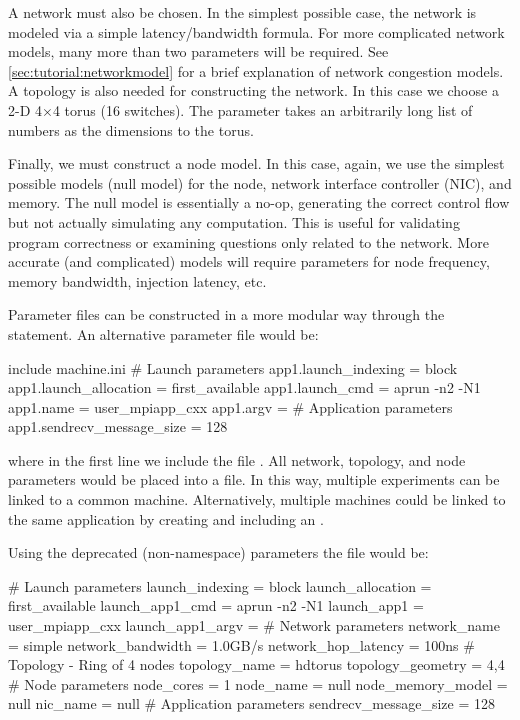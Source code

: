 A network must also be chosen.  
In the simplest possible case, the network is modeled via a simple latency/bandwidth formula.  
For more complicated network models, many more than two parameters will be required. 
See \ref{sec:tutorial:networkmodel} for a brief explanation of \sstmacro network congestion models. 
A topology is also needed for constructing the network.  
In this case we choose a 2-D 4$\times$4 torus (16 switches).  The  
parameter takes an arbitrarily long list of numbers as the dimensions to the torus.

Finally, we must construct a node model.  
In this case, again, we use the simplest possible models (null model) for the node, 
network interface controller (NIC), and memory.  
The null model is essentially a no-op, generating the correct control flow but not actually simulating any computation. 
This is useful for validating program correctness or examining questions only related to the network.  
More accurate (and complicated) models will require parameters for node frequency, memory bandwidth, injection latency, etc.

Parameter files can be constructed in a more modular way through the  statement.  
An alternative parameter file would be:

\begin{ViFile}
include machine.ini
# Launch parameters
app1.launch_indexing = block
app1.launch_allocation = first_available
app1.launch_cmd = aprun -n2 -N1
app1.name = user_mpiapp_cxx
app1.argv = 
# Application parameters
app1.sendrecv_message_size = 128
\end{ViFile}
where in the first line we include the file .  
All network, topology, and node parameters would be placed into a  file.  
In this way, multiple experiments can be linked to a common machine.  
Alternatively, multiple machines could be linked to the same application by creating and including an .

Using the deprecated (non-namespace) parameters the file would be:

\begin{ViFile}
# Launch parameters
launch_indexing = block
launch_allocation = first_available
launch_app1_cmd = aprun -n2 -N1
launch_app1 = user_mpiapp_cxx
launch_app1_argv = 
# Network parameters
network_name = simple
network_bandwidth = 1.0GB/s
network_hop_latency = 100ns
# Topology - Ring of 4 nodes
topology_name = hdtorus
topology_geometry = 4,4
# Node parameters
node_cores = 1
node_name = null
node_memory_model = null
nic_name = null
# Application parameters
sendrecv_message_size = 128
\end{ViFile}


